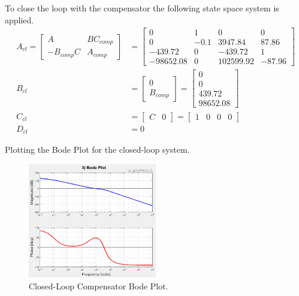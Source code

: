 \documentclass[11pt]{article}
\begin{document}
\begin{enumerate}[label=\textbf{\arabic*.}]
  To close the loop with the compensator the following state space system is 
  applied.
  \begin{equation}
    \begin{split}
      A_{cl} =
      \begin{bmatrix}
        A & BC_{comp} \\ -B_{comp}C & A_{comp}
      \end{bmatrix} 
      &=
      \begin{bmatrix}
        0 & 1 & 0 & 0 \\ 
        0 & -0.1 & 3947.84 & 87.86 \\ 
        -439.72 & 0 & -439.72 & 1 \\
        -98652.08 & 0 & 102599.92 & -87.96
      \end{bmatrix} \\
      B_{cl} &= 
      \begin{bmatrix}
        0 \\ B_{comp}
      \end{bmatrix} 
      =
      \begin{bmatrix}
        0 \\ 0 \\ 439.72 \\ 98652.08
      \end{bmatrix} \\
      C_{cl} &=
      \begin{bmatrix}
        C & 0
      \end{bmatrix}
      =
      \begin{bmatrix}
        1 & 0 & 0 & 0
      \end{bmatrix} \\
      D_{cl} &= 0
    \end{split}
  \end{equation}

  Plotting the Bode Plot for the closed-loop system.
  \begin{figure}[H]
    \centering
    \includegraphics[width=0.5\textwidth]{p4.png}
    \caption{Closed-Loop Compensator Bode Plot.}
  \end{figure}


\end{enumerate}
\end{document}
